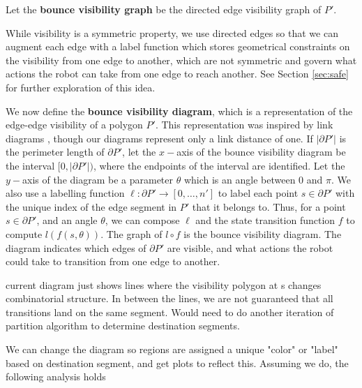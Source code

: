 \documentclass[]{styles/svproc}  %
\begin{document}
\begin{definition}
Let the \textbf{bounce visibility graph} be the directed edge visibility graph of
$P'$.
\end{definition}

While visibility is a symmetric property, we use directed edges so that 
we can augment each edge with a label function which stores
geometrical constraints on the visibility from one edge to another, which are
not symmetric and govern what actions the robot can take from one edge to
reach another. See Section \ref{sec:safe} for further exploration of this idea.


We now define the \textbf{bounce visibility diagram}, which is a
representation of the edge-edge visibility of a polygon $P'$. This representation
was inspired by link diagrams \cite{efrat2000sweeping,tan_sweep}, though our
diagrams represent only a link distance of one.
If $|\partial P'|$ is the perimeter length of $\partial P'$, let the $x-$axis of the
bounce visibility diagram be the interval $[0, |\partial P'|)$, where the
endpoints of the interval are identified. Let the $y-$axis of the diagram be a
parameter $\theta$ which is an angle between $0$ and $\pi$.
We also use a labelling function $\ell: \partial P' \to [0, \ldots, n']$ to
label each point $s \in \partial P'$ with the unique index of the edge segment in $P'$ that it
belongs to. Thus, for a point $s \in \partial P'$, and an angle $\theta$, we can
compose $\ell$ and the state transition function $f$ to compute
$l(f(s,\theta))$. The graph of $l \circ f$ is the bounce visibility diagram. The
diagram indicates which edges
of $\partial P'$ are visible, and what actions the robot could take to
transition from one edge to another.

{\color{red} current diagram just shows lines where the visibility polygon at s
changes combinatorial structure. In between the lines, we are not guaranteed
that all transitions land on the same segment. Would need to do another
iteration of partition algorithm to determine destination segments.}

{\color{red} We can change the diagram so regions are assigned a unique "color" or "label" based on
destination segment, and get plots to reflect this. Assuming we do, the
following analysis holds}
\end{document}
